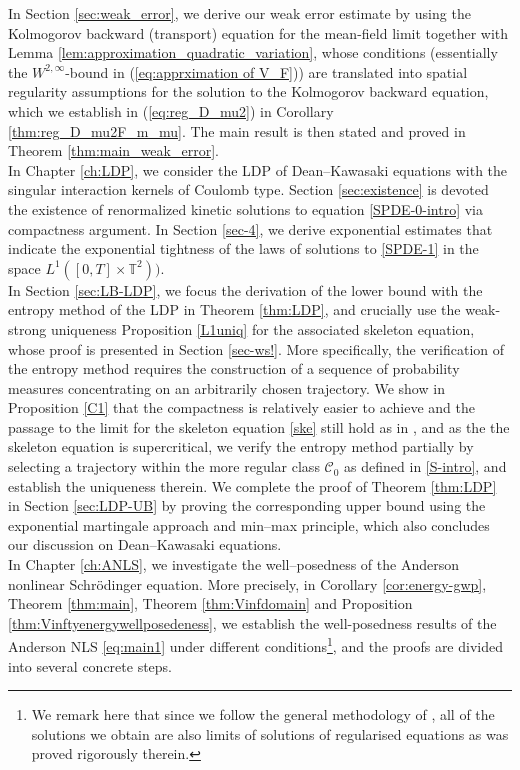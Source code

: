In Section \ref{sec:weak_error}, we derive our weak error estimate by using the Kolmogorov backward (transport) equation for the mean-field limit together with Lemma \ref{lem:approximation_quadratic_variation}, whose conditions (essentially the $W^{2,\infty}$-bound in (\ref{eq:apprximation of V_F})) are translated into  spatial regularity assumptions for the solution to the Kolmogorov backward equation, which we establish in (\ref{eq:reg_D_mu2}) in Corollary \ref{thm:reg_D_mu2F_m_mu}. The main result is then stated and proved in Theorem \ref{thm:main_weak_error}.\\

In Chapter \ref{ch:LDP}, we consider the LDP of Dean--Kawasaki equations with the singular interaction kernels of Coulomb type. Section \ref{sec:existence} is devoted the existence of renormalized kinetic solutions to equation \eqref{SPDE-0-intro} via compactness argument. In Section \ref{sec-4}, we derive exponential estimates that indicate the exponential tightness of the laws of solutions to \eqref{SPDE-1} in the space $L^1([0,T] \times \mathbb{T}^2))$. \\ 

In Section \ref{sec:LB-LDP}, we focus the derivation of the lower bound with the entropy method of the LDP 
in Theorem \ref{thm:LDP}, and crucially use the weak-strong uniqueness Proposition \ref{L1uniq} for the associated skeleton equation, whose proof is presented in Section \ref{sec-ws!}. More specifically, the verification of the entropy method requires the construction of a sequence of probability measures concentrating on an arbitrarily chosen trajectory. We show in Proposition \ref{C1} that the compactness is relatively easier to achieve and the passage to the limit for the skeleton equation \eqref{ske} still hold as in \cite{FG24,WZ22}, and as the the skeleton equation is supercritical, we verify the entropy method partially by selecting a trajectory within the more regular class $\mathcal{C}_0$ as defined in \eqref{S-intro}, and establish the uniqueness therein. We complete the proof of Theorem \ref{thm:LDP} in Section \ref{sec:LDP-UB} by proving the corresponding upper bound using the exponential martingale approach and min--max principle, which also concludes our discussion on Dean--Kawasaki equations.\\


In Chapter \ref{ch:ANLS}, we investigate the well--posedness of the Anderson nonlinear Schrödinger equation. More precisely, in Corollary \ref{cor:energy-gwp}, Theorem \ref{thm:main}, Theorem \ref{thm:Vinfdomain} and
Proposition \ref{thm:Vinftyenergywellposedeness}, we establish the
well-posedness results of the Anderson NLS \eqref{eq:main1} under different
conditions\footnote{We remark here that since we follow the general methodology of {\cite{GUZ20}}, all of the
solutions we obtain are also limits of solutions of regularised equations as
was proved rigorously therein.}, and the proofs are divided into several concrete steps.\\

